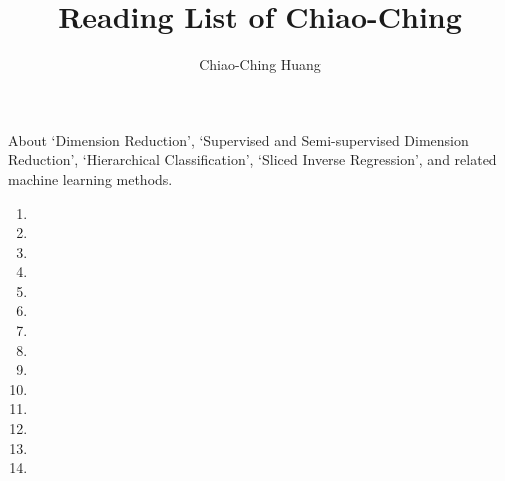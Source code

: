 \documentclass[12pt]{article}
\begin{document}
\begin{CJK}{UTF8}{cwku}

\title{Reading List of Chiao-Ching}
\author{Chiao-Ching Huang}
\maketitle

About `Dimension Reduction', `Supervised and Semi-supervised Dimension Reduction', `Hierarchical Classification', `Sliced Inverse Regression', and related machine learning methods.

\begin{enumerate}
\item {}
\item {}
\item {}
\item {}
\item {}
\item {}
\item {}
\item {}
\item {}
\item {}
\item {}
\item {}
\item {}
\item {}

\end{enumerate}



 


\end{CJK}
\end{document}

